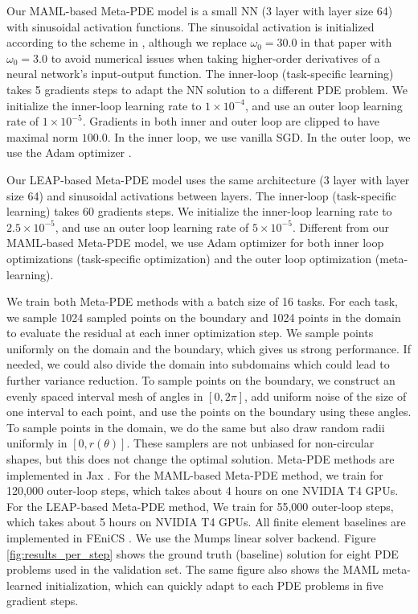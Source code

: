 Our MAML-based Meta-PDE model is a small NN (3 layer with layer size 64) with sinusoidal activation functions. The sinusoidal activation is initialized according to the scheme in \citet{sitzmann2020implicit}, although we replace $\omega_0 = 30.0$ in that paper with $\omega_0 = 3.0$ to avoid numerical issues when taking higher-order derivatives of a neural network's input-output function. The inner-loop (task-specific learning) takes 5 gradients steps to adapt the NN solution to a different PDE problem. We initialize the inner-loop learning rate to $1\times 10^{-4}$, and use an outer loop learning rate of $1\times 10^{-5}$. Gradients in both inner and outer loop are clipped to have maximal norm $100.0$. In the inner loop, we use vanilla SGD. In the outer loop, we use the Adam optimizer \citep{kingma2014adam}. 

Our LEAP-based Meta-PDE model uses the same architecture (3 layer with layer size 64) and sinusoidal activations between layers. The inner-loop (task-specific learning) takes 60 gradients steps. We initialize the inner-loop learning rate to $2.5\times 10^{-5}$, and use an outer loop learning rate of $5\times 10^{-5}$. Different from our MAML-based Meta-PDE model, we use  Adam optimizer \citep{kingma2014adam} for both inner loop optimizations (task-specific optimization) and the outer loop optimization (meta-learning).

We train both Meta-PDE methods with a batch size of 16 tasks. For each task, we sample 1024 sampled points on the boundary and 1024 points in the domain to evaluate the residual at each inner optimization step. 
We sample points uniformly on the domain and the boundary, which gives us strong performance. If needed, we could also divide the domain into subdomains which could lead to further variance reduction.
To sample points on the boundary, we construct an evenly spaced interval mesh of angles in $[0, 2\pi]$, add uniform noise of the size of one interval to each point, and use the points on the boundary using these angles. To sample points in the domain, we do the same but also draw random radii uniformly in $[0, r(\theta)]$. These samplers are not unbiased for non-circular shapes, but this does not change the optimal solution. 
Meta-PDE methods are implemented in Jax \citep{jax2018github}. For the MAML-based Meta-PDE method, we train for 120,000 outer-loop steps, which takes about 4 hours on one NVIDIA T4 GPUs. For the LEAP-based Meta-PDE method, We train for 55,000 outer-loop steps, which takes about 5 hours on NVIDIA T4 GPUs. All finite element baselines are implemented in FEniCS \citep{LoggMardalEtAl2012a,AlnaesBlechta2015a}. We use the Mumps linear solver backend. Figure \ref{fig:results_per_step} shows the ground truth (baseline) solution for eight PDE problems used in the validation set. The same figure also shows the MAML meta-learned initialization, which can quickly adapt to each PDE problems in five gradient steps. 

